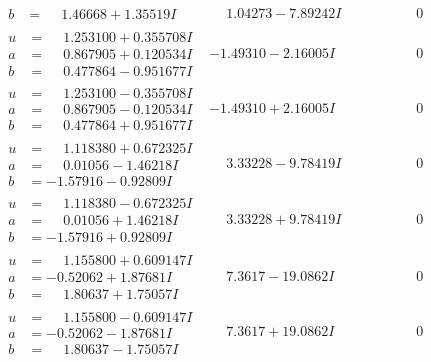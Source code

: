 \documentclass[1p]{elsarticle_modified}
\theoremstyle{definition}
\begin{document}
$$\begin{array}{c|c|c}
\begin{aligned}
b &= \phantom{-}1.46668 + 1.35519 I\end{aligned}
 & \phantom{-}1.04273 - 7.89242 I & \phantom{-0.000000 } 0 \\ \hline\begin{aligned}
u &= \phantom{-}1.253100 + 0.355708 I \\
a &= \phantom{-}0.867905 + 0.120534 I \\
b &= \phantom{-}0.477864 - 0.951677 I\end{aligned}
 & -1.49310 - 2.16005 I & \phantom{-0.000000 } 0 \\ \hline\begin{aligned}
u &= \phantom{-}1.253100 - 0.355708 I \\
a &= \phantom{-}0.867905 - 0.120534 I \\
b &= \phantom{-}0.477864 + 0.951677 I\end{aligned}
 & -1.49310 + 2.16005 I & \phantom{-0.000000 } 0 \\ \hline\begin{aligned}
u &= \phantom{-}1.118380 + 0.672325 I \\
a &= \phantom{-}0.01056 - 1.46218 I \\
b &= -1.57916 - 0.92809 I\end{aligned}
 & \phantom{-}3.33228 - 9.78419 I & \phantom{-0.000000 } 0 \\ \hline\begin{aligned}
u &= \phantom{-}1.118380 - 0.672325 I \\
a &= \phantom{-}0.01056 + 1.46218 I \\
b &= -1.57916 + 0.92809 I\end{aligned}
 & \phantom{-}3.33228 + 9.78419 I & \phantom{-0.000000 } 0 \\ \hline\begin{aligned}
u &= \phantom{-}1.155800 + 0.609147 I \\
a &= -0.52062 + 1.87681 I \\
b &= \phantom{-}1.80637 + 1.75057 I\end{aligned}
 & \phantom{-}7.3617 - 19.0862 I & \phantom{-0.000000 } 0 \\ \hline\begin{aligned}
u &= \phantom{-}1.155800 - 0.609147 I \\
a &= -0.52062 - 1.87681 I \\
b &= \phantom{-}1.80637 - 1.75057 I\end{aligned}
 & \phantom{-}7.3617 + 19.0862 I & \phantom{-0.000000 } 0 \\ \hline\begin{aligned}

\end{aligned}
\end{array}$$
\end{document}
